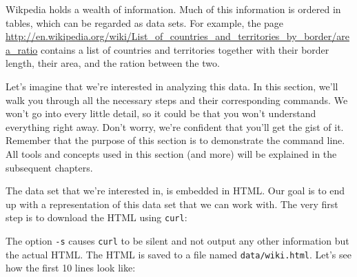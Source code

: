 \documentclass[
]{book}
\newenvironment{Shaded}{\begin{snugshade}}{\end{snugshade}}
\newcommand{\ExtensionTok}[1]{#1}
\newcommand{\NormalTok}[1]{#1}
\newcommand{\OperatorTok}[1]{\textcolor[rgb]{0.81,0.36,0.00}{\textbf{#1}}}
\newcommand{\StringTok}[1]{\textcolor[rgb]{0.31,0.60,0.02}{#1}}
\theoremstyle{definition}
\theoremstyle{definition}
\theoremstyle{definition}
\theoremstyle{remark}
\begin{document}
Wikpedia holds a wealth of information. Much of this information is ordered in tables, which can be regarded as data sets. For example, the page \url{http://en.wikipedia.org/wiki/List_of_countries_and_territories_by_border/area_ratio} contains a list of countries and territories together with their border length, their area, and the ration between the two.

Let's imagine that we're interested in analyzing this data. In this section, we'll walk you through all the necessary steps and their corresponding commands. We won't go into every little detail, so it could be that you won't understand everything right away. Don't worry, we're confident that you'll get the gist of it. Remember that the purpose of this section is to demonstrate the command line. All tools and concepts used in this section (and more) will be explained in the subsequent chapters.

The data set that we're interested in, is embedded in HTML. Our goal is to end up with a representation of this data set that we can work with. The very first step is to download the HTML using \texttt{curl}:

\begin{Shaded}
\end{Shaded}

The option \texttt{-s} causes \texttt{curl} to be silent and not output any other information but the actual HTML. The HTML is saved to a file named \texttt{data/wiki.html}. Let's see how the first 10 lines look like:
\end{document}
